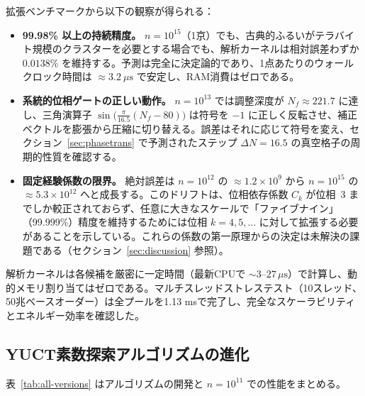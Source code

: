 \documentclass[11pt,a4paper]{article}
\begin{document}
	拡張ベンチマークから以下の観察が得られる：
	
	\begin{itemize}
		\item \textbf{99.98\% 以上の持続精度。}
		\(n = 10^{15}\)（1京）でも、古典的ふるいがテラバイト規模のクラスターを必要とする場合でも、解析カーネルは相対誤差わずか \(0.0138\%\) を維持する。予測は完全に決定論的であり、1点あたりのウォールクロック時間は \(\approx 3.2\ \mu\text{s}\) で安定し、RAM消費はゼロである。
		
		\item \textbf{系統的位相ゲートの正しい動作。}
		\(n = 10^{13}\) では調整深度が \(N_f \approx 221.7\) に達し、三角演算子 \(\sin\!\bigl(\frac{\pi}{16.5}(N_f-80)\bigr)\) は符号を \(-1\) に正しく反転させ、補正ベクトルを膨張から圧縮に切り替える。誤差はそれに応じて符号を変え、セクション~\ref{sec:phasetrans} で予測されたステップ \(\Delta N = 16.5\) の真空格子の周期的性質を確認する。
		
		\item \textbf{固定経験係数の限界。}
		絶対誤差は \(n = 10^{12}\) の \(\approx 1.2\times 10^{9}\) から \(n = 10^{15}\) の \(\approx 5.3\times 10^{12}\) へと成長する。このドリフトは、位相依存係数 \(C_k\) が位相~3 までしか較正されておらず、任意に大きなスケールで「ファイブナイン」（99.999\%）精度を維持するためには位相 \(k = 4, 5, \dots\) に対して拡張する必要があることを示している。これらの係数の第一原理からの決定は未解決の課題である（セクション~\ref{sec:discussion} 参照）。
	\end{itemize}
	
	解析カーネルは各候補を厳密に一定時間（最新CPUで \(\sim 3\)--\(27\,\mu\text{s}\)）で計算し、動的メモリ割り当てはゼロである。マルチスレッドストレステスト（10スレッド、50兆ベースオーダー）は全プールを1.13 msで完了し、完全なスケーラビリティとエネルギー効率を確認した。
	
	\subsection{YUCT素数探索アルゴリズムの進化}
	表~\ref{tab:all-versions} はアルゴリズムの開発と \(n=10^{11}\) での性能をまとめる。
	
\end{document}
